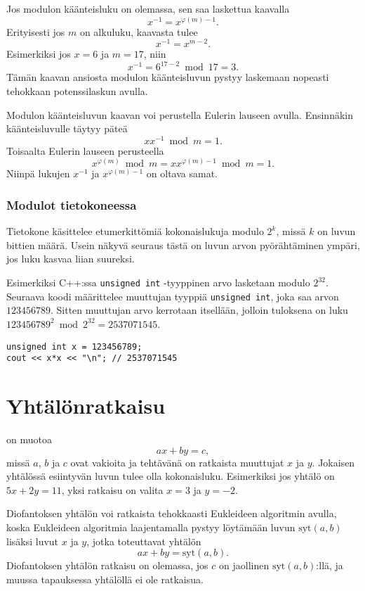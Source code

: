 Jos modulon käänteisluku on olemassa,
sen saa laskettua kaavalla
\[
x^{-1} = x^{\varphi(m)-1}.
\]
Erityisesti jos $m$ on alkuluku, kaavasta tulee
\[
x^{-1} = x^{m-2}.
\]
Esimerkiksi jos $x=6$ ja $m=17$, niin
\[x^{-1}=6^{17-2} \bmod 17 = 3.\]
Tämän kaavan ansiosta modulon käänteisluvun pystyy
laskemaan nopeasti tehokkaan potenssilaskun avulla.

Modulon käänteisluvun kaavan voi perustella Eulerin lauseen avulla.
Ensinnäkin käänteisluvulle täytyy päteä
\[
x x^{-1} \bmod m = 1.
\]
Toisaalta Eulerin lauseen perusteella
\[
x^{\varphi(m)} \bmod m =  xx^{\varphi(m)-1} \bmod m = 1.
\]
Niinpä lukujen $x^{-1}$ ja $x^{\varphi(m)-1}$ on oltava samat.

\subsubsection{Modulot tietokoneessa}

Tietokone käsittelee etumerkittömiä kokonaislukuja
modulo $2^k$, missä $k$ on luvun bittien määrä.
Usein näkyvä seuraus tästä on luvun arvon pyörähtäminen
ympäri, jos luku kasvaa liian suureksi.

Esimerkiksi C++:ssa \texttt{unsigned int} -tyyppinen
arvo lasketaan modulo $2^{32}$.
Seuraava koodi määrittelee muuttujan
tyyppiä \texttt{unsigned int},
joka saa arvon $123456789$.
Sitten muuttujan arvo kerrotaan itsellään,
jolloin tuloksena on luku 
$123456789^2 \bmod 2^{32} = 2537071545$.

\begin{lstlisting}
unsigned int x = 123456789;
cout << x*x << "\n"; // 2537071545
\end{lstlisting}

\section{Yhtälönratkaisu}


 on muotoa
\[ ax + by = c, \]
missä $a$, $b$ ja $c$ ovat vakioita
ja tehtävänä on ratkaista muuttujat $x$ ja $y$.
Jokaisen yhtälössä esiintyvän luvun tulee
olla kokonaisluku.
Esimerkiksi jos yhtälö on $5x+2y=11$, yksi ratkaisu
on valita $x=3$ ja $y=-2$.


Diofantoksen yhtälön voi ratkaista
tehokkaasti Eukleideen algoritmin avulla,
koska Eukleideen algoritmia laajentamalla
pystyy löytämään luvun $\textrm{syt}(a,b)$
lisäksi luvut $x$ ja $y$,
jotka toteuttavat yhtälön
\[
ax + by = \textrm{syt}(a,b).
\]
Diofantoksen yhtälön ratkaisu on olemassa, jos $c$ on
jaollinen $\textrm{syt}(a,b)$:llä,
ja muussa tapauksessa yhtälöllä ei ole ratkaisua.

